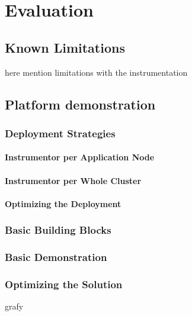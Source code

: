 \chapter{Evaluation}
\label{chap:evaluation}
\section{Known Limitations}
here mention limitations with the instrumentation


\section{Platform demonstration}
\subsection{Deployment Strategies}
\subsubsection{Instrumentor per Application Node}
\subsubsection{Instrumentor per Whole Cluster}
\subsubsection{Optimizing the Deployment}
\subsection{Basic Building Blocks}
\subsection{Basic Demonstration}
\subsection{Optimizing the Solution}

grafy
